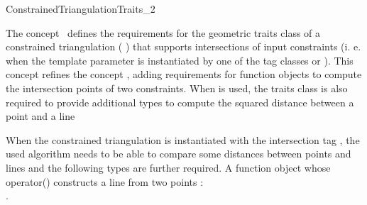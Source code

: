 

\begin{ccRefConcept}{ConstrainedTriangulationTraits_2}


\ccDefinition
  
The concept \ccRefName\ defines the requirements for the geometric
traits class of a constrained triangulation
( )
that supports intersections of input constraints (i. e.
when the template parameter  is instantiated
by one of the tag classes  or
). This concept refines the concept
, adding requirements for function objects
to compute the intersection points of two constraints.
When  is used, the 
traits class is
also required to provide  additional types
to compute the squared distance between a point and a line


\ccRefines
{} 


\ccTypes


When the constrained triangulation is instantiated with 
the intersection tag ,
the used algorithm needs to be able to compare some
distances between points and lines and the following
types are further required.
\ccGlue
{} {A function object whose operator()
constructs a line from two points : \\
.}
\ccGlue
{}



\end{ccRefConcept}

